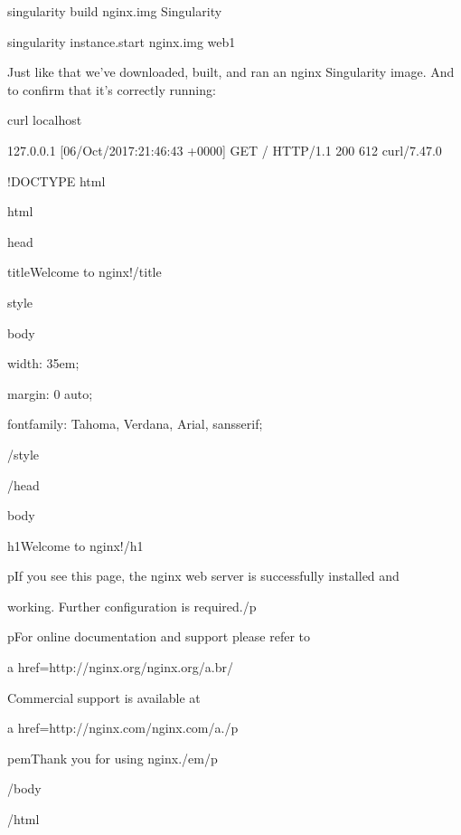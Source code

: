 \documentclass[letterpaper,10pt,english]{sphinxmanual}
\begin{document}
%
\begin{sphinxVerbatim}[commandchars=\\\{\}]
\PYGZsh{} singularity build nginx.img Singularity

\PYGZsh{} singularity instance.start nginx.img web1
\end{sphinxVerbatim}

Just like that we’ve downloaded, built, and ran an nginx Singularity
image. And to confirm that it’s correctly running:

%
\begin{sphinxVerbatim}[commandchars=\\\{\}]
\PYGZdl{} curl localhost

127.0.0.1 \PYGZhy{} \PYGZhy{} [06/Oct/2017:21:46:43 +0000] \PYGZdq{}GET / HTTP/1.1\PYGZdq{} 200 612 \PYGZdq{}\PYGZhy{}\PYGZdq{} \PYGZdq{}curl/7.47.0\PYGZdq{} \PYGZdq{}\PYGZhy{}\PYGZdq{}

\PYGZlt{}!DOCTYPE html\PYGZgt{}

\PYGZlt{}html\PYGZgt{}

\PYGZlt{}head\PYGZgt{}

\PYGZlt{}title\PYGZgt{}Welcome to nginx!\PYGZlt{}/title\PYGZgt{}

\PYGZlt{}style\PYGZgt{}

    body \PYGZob{}

        width: 35em;

        margin: 0 auto;

        font\PYGZhy{}family: Tahoma, Verdana, Arial, sans\PYGZhy{}serif;

    \PYGZcb{}

\PYGZlt{}/style\PYGZgt{}

\PYGZlt{}/head\PYGZgt{}

\PYGZlt{}body\PYGZgt{}

\PYGZlt{}h1\PYGZgt{}Welcome to nginx!\PYGZlt{}/h1\PYGZgt{}

\PYGZlt{}p\PYGZgt{}If you see this page, the nginx web server is successfully installed and

working. Further configuration is required.\PYGZlt{}/p\PYGZgt{}


\PYGZlt{}p\PYGZgt{}For online documentation and support please refer to

\PYGZlt{}a href=\PYGZdq{}http://nginx.org/\PYGZdq{}\PYGZgt{}nginx.org\PYGZlt{}/a\PYGZgt{}.\PYGZlt{}br/\PYGZgt{}

Commercial support is available at

\PYGZlt{}a href=\PYGZdq{}http://nginx.com/\PYGZdq{}\PYGZgt{}nginx.com\PYGZlt{}/a\PYGZgt{}.\PYGZlt{}/p\PYGZgt{}


\PYGZlt{}p\PYGZgt{}\PYGZlt{}em\PYGZgt{}Thank you for using nginx.\PYGZlt{}/em\PYGZgt{}\PYGZlt{}/p\PYGZgt{}

\PYGZlt{}/body\PYGZgt{}

\PYGZlt{}/html\PYGZgt{}
\end{sphinxVerbatim}
\end{document}
